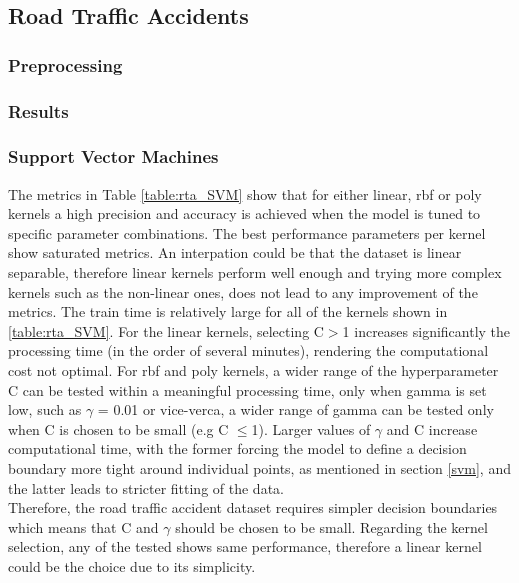 \documentclass{article}
\begin{document}
\subsection{Road Traffic Accidents}
\subsubsection{Preprocessing}
\subsubsection{Results}

\subsubsection*{Support Vector Machines}
The metrics in Table \ref{table:rta_SVM} show that for either linear, rbf or poly kernels a high precision and accuracy is achieved when the model is tuned to specific parameter combinations. The best performance parameters per kernel show saturated metrics. An interpation could be that the dataset is linear separable, therefore linear kernels perform well enough and trying more complex kernels such as the non-linear ones, does not lead to any improvement of the metrics. The train time is relatively large for all of the kernels shown in \ref{table:rta_SVM}. For the linear kernels, selecting C$>$1 increases significantly the processing time (in the order of several minutes), rendering the computational cost not optimal. For rbf and poly kernels, a wider range of the hyperparameter C can be tested within a meaningful processing time, only when gamma is set low, such as $\gamma$ = 0.01 or vice-verca, a wider range of gamma can be tested only when C is chosen to be small (e.g C $\le$1). Larger values of $\gamma$ and C increase computational time, with the former forcing the model to define a decision boundary more tight around individual points, as mentioned in section \ref{svm}, and the latter leads to stricter fitting of the data. 
\\ 
Therefore, the road traffic accident dataset requires simpler decision boundaries which means that C and $\gamma$ should be chosen to be small. Regarding the kernel selection, any of the tested shows same performance, therefore a linear kernel could be the choice due to its simplicity.  
\end{document}
